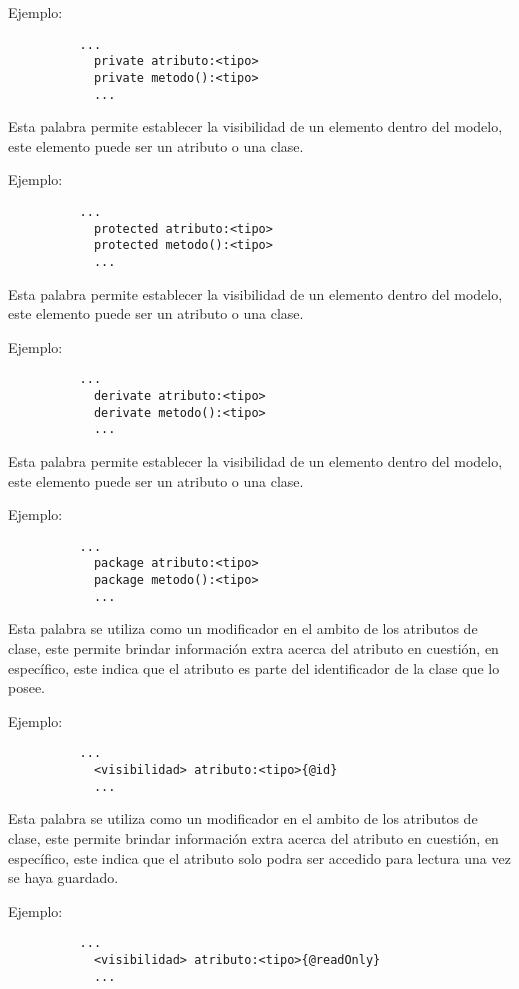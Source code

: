 \begin{description}[align=right,labelwidth=2.5cm]
	Ejemplo:
		\begin{lstlisting}
		  ...
			private atributo:<tipo>
			private metodo():<tipo>
			...
		\end{lstlisting}

\item [protected] Esta palabra permite establecer la visibilidad de un elemento
	dentro del modelo, este elemento puede ser un atributo o una clase.

	Ejemplo:
		\begin{lstlisting}
		  ...
			protected atributo:<tipo>
			protected metodo():<tipo>
			...
		\end{lstlisting}

\item[derivate] Esta palabra permite establecer la visibilidad de un elemento
	dentro del modelo, este elemento puede ser un atributo o una clase.

	Ejemplo:
		\begin{lstlisting}
		  ...
			derivate atributo:<tipo>
			derivate metodo():<tipo>
			...
		\end{lstlisting}

\item [package] Esta palabra permite establecer la visibilidad de un elemento
	dentro del modelo, este elemento puede ser un atributo o una clase.

	Ejemplo:
		\begin{lstlisting}
		  ...
			package atributo:<tipo>
			package metodo():<tipo>
			...
		\end{lstlisting}

\item [@id] Esta palabra se utiliza como un modificador en el ambito de
	los atributos de clase, este permite brindar información extra acerca del
	atributo en cuestión, en específico, este indica que el atributo es parte del
	identificador de la clase que lo posee.

	Ejemplo:
		\begin{lstlisting}
		  ...
			<visibilidad> atributo:<tipo>{@id}
			...
		\end{lstlisting}

\item [@readOnly] Esta palabra se utiliza como un modificador en el ambito de
	los atributos de clase, este permite brindar información extra acerca del
	atributo en cuestión, en específico, este indica que el atributo solo podra
	ser accedido para lectura una vez se haya guardado.

	Ejemplo:
		\begin{lstlisting}
		  ...
			<visibilidad> atributo:<tipo>{@readOnly}
			...
		\end{lstlisting}


\end{description}
